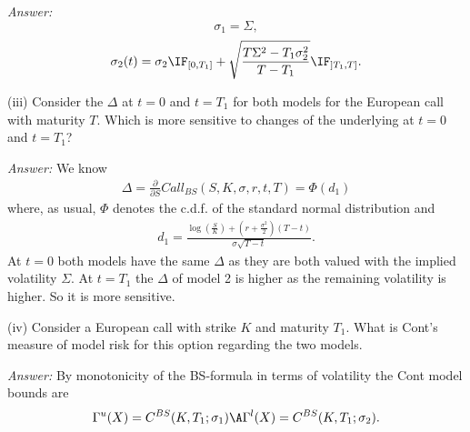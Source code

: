 \documentclass[11pt,a4paper,titlepage]{article}
\begin{document}
{\it Answer:}
$$
\sigma_1 = \Sigma,
$$
$$
\sigma_2(t) = \sigma_2 \IF_{[0,T_1]}+ \sqrt{\frac{T\Sigma^2 -T_1\sigma_2^2}{T-T_1}}\IF_{]T_1, T]}.
$$
\item[(iii)]
Consider the $\Delta$ at $t=0$ and $t=T_1$ for both models for the European call with maturity $T$. Which is more sensitive to changes of the underlying at $t=0$ and $t=T_1$?

{\it Answer:}
We know
\begin{align*}
  \Delta = \frac{\partial}{\partial S}Call_{BS}(S,K,\sigma,r,t,T) = \Phi(d_1)
\end{align*}
where, as usual, $\Phi$ denotes the c.d.f. of the standard normal distribution and
\begin{align*}
  d_1 = \frac{\log \left( \frac{S}{K} \right) + \left( r + \frac{\sigma^2}{2}
  \right)(T-t)}{\sigma \sqrt{T-t}}.
\end{align*}
At $t=0$ both models have the same $\Delta$ as they are both valued with the implied volatility $\Sigma$.
At $t=T_1$ the  $\Delta$ of model 2 is higher as the remaining volatility is higher. So it is more sensitive.

\item[(iv)]
Consider  a  European call with strike $K$ and maturity $T_1$. What is Cont's measure of model risk for this option regarding the two models.

{\it Answer:}
By monotonicity of the BS-formula in terms of volatility the Cont model bounds are
$$
\Gamma^u(X)=C^{BS}(K, T_1; \sigma_1)  \A \Gamma^l(X)=C^{BS}(K, T_1; \sigma_2).$$















\vspace{0.5cm}
\end{document}
